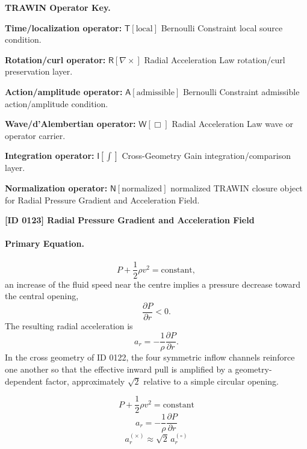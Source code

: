 \par\vspace{0.45\baselineskip}
\noindent\begin{minipage}[t]{\linewidth}
\begingroup
\small
\raggedright
\textbf{TRAWIN Operator Key.}\par
\noindent\textbf{Time/localization operator:} $\mathsf{T}\!\left[\mathrm{local}\right]$ Bernoulli Constraint local source condition.\par
\noindent\textbf{Rotation/curl operator:} $\mathsf{R}\!\left[\nabla\times\right]$ Radial Acceleration Law rotation/curl preservation layer.\par
\noindent\textbf{Action/amplitude operator:} $\mathsf{A}\!\left[\mathrm{admissible}\right]$ Bernoulli Constraint admissible action/amplitude condition.\par
\noindent\textbf{Wave/d'Alembertian operator:} $\mathsf{W}\!\left[\Box\right]$ Radial Acceleration Law wave or operator carrier.\par
\noindent\textbf{Integration operator:} $\mathsf{I}\!\left[\int\right]$ Cross-Geometry Gain integration/comparison layer.\par
\noindent\textbf{Normalization operator:} $\mathsf{N}\!\left[\mathrm{normalized}\right]$ normalized TRAWIN closure object for Radial Pressure Gradient and Acceleration Field.\par
\endgroup
\end{minipage}

\clearpage
\noindent\textbf{[ID 0123] Radial Pressure Gradient and Acceleration Field}\par
\vspace{0.35em}
\paragraph{Primary Equation.}
\[ P + \frac{1}{2}\rho v^2 = \text{constant}, \] an increase of the fluid speed near the centre implies a pressure decrease toward the central opening, \[ \frac{\partial P}{\partial r} < 0. \] The resulting radial acceleration is \[ a_r = -\frac{1}{\rho}\frac{\partial P}{\partial r}. \] In the cross geometry of ID 0122, the four symmetric inflow channels reinforce one another so that the effective inward pull is amplified by a geometry-dependent factor, approximately $\sqrt{2}$ relative to a simple circular opening.

\[
P + \frac{1}{2}\rho v^2 = \mathrm{constant}
\]
\[
a_r = -\frac{1}{\rho}\frac{\partial P}{\partial r}
\]
\[
a_r^{(\times)} \approx \sqrt{2}\, a_r^{(\circ)}
\]

